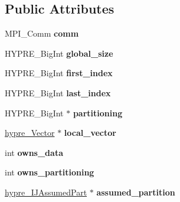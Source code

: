 \subsection*{Public Attributes}
\begin{DoxyCompactItemize}
\item 
\hypertarget{structhypre__ParVector_ae656babfa6001082e2968d408b0d3058}{}M\+P\+I\+\_\+\+Comm {\bfseries comm}\label{structhypre__ParVector_ae656babfa6001082e2968d408b0d3058}

\item 
\hypertarget{structhypre__ParVector_a76a4f3da859c1fc33fa329409eb1eab6}{}H\+Y\+P\+R\+E\+\_\+\+Big\+Int {\bfseries global\+\_\+size}\label{structhypre__ParVector_a76a4f3da859c1fc33fa329409eb1eab6}

\item 
\hypertarget{structhypre__ParVector_a186613d4e86eaa15b0736ea5e1166944}{}H\+Y\+P\+R\+E\+\_\+\+Big\+Int {\bfseries first\+\_\+index}\label{structhypre__ParVector_a186613d4e86eaa15b0736ea5e1166944}

\item 
\hypertarget{structhypre__ParVector_a83d37f8f7b3d220c42308091e7fb4ed1}{}H\+Y\+P\+R\+E\+\_\+\+Big\+Int {\bfseries last\+\_\+index}\label{structhypre__ParVector_a83d37f8f7b3d220c42308091e7fb4ed1}

\item 
\hypertarget{structhypre__ParVector_aebfaa776fc9780eaeb0238b0d4619c5c}{}H\+Y\+P\+R\+E\+\_\+\+Big\+Int $\ast$ {\bfseries partitioning}\label{structhypre__ParVector_aebfaa776fc9780eaeb0238b0d4619c5c}

\item 
\hypertarget{structhypre__ParVector_a8af58c6f4a53f28a12516bdab6b40de0}{}\hyperlink{structhypre__Vector}{hypre\+\_\+\+Vector} $\ast$ {\bfseries local\+\_\+vector}\label{structhypre__ParVector_a8af58c6f4a53f28a12516bdab6b40de0}

\item 
\hypertarget{structhypre__ParVector_a242882a2d0c32a38b671e29dd075af6a}{}int {\bfseries owns\+\_\+data}\label{structhypre__ParVector_a242882a2d0c32a38b671e29dd075af6a}

\item 
\hypertarget{structhypre__ParVector_a2e55bf57f378bb7b135d4c968e0c7b60}{}int {\bfseries owns\+\_\+partitioning}\label{structhypre__ParVector_a2e55bf57f378bb7b135d4c968e0c7b60}

\item 
\hypertarget{structhypre__ParVector_a0bcc3e0675d291c1b9ca10cb74037f62}{}\hyperlink{structhypre__IJAssumedPart}{hypre\+\_\+\+I\+J\+Assumed\+Part} $\ast$ {\bfseries assumed\+\_\+partition}\label{structhypre__ParVector_a0bcc3e0675d291c1b9ca10cb74037f62}

\end{DoxyCompactItemize}



